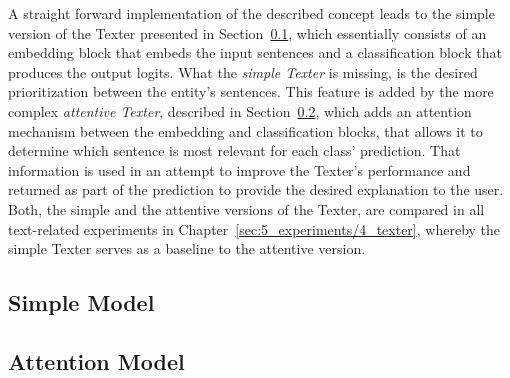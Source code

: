 A straight forward implementation of the described concept leads to the simple version of the Texter presented in Section~\ref{subsec:4_approach/1_texter/1_simple_model}, which essentially consists of an embedding block that embeds the input sentences and a classification block that produces the output logits. What the \emph{simple Texter} is missing, is the desired prioritization between the entity's sentences. This feature is added by the more complex \emph{attentive Texter}, described in Section~\ref{subsec:4_approach/1_texter/2_attention_model}, which adds an attention mechanism between the embedding and classification blocks, that allows it to determine which sentence is most relevant for each class' prediction. That information is used in an attempt to improve the Texter's performance and returned as part of the prediction to provide the desired explanation to the user. Both, the simple and the attentive versions of the Texter, are compared in all text-related experiments in Chapter~\ref{sec:5_experiments/4_texter}, whereby the simple Texter serves as a baseline to the attentive version.

\subsection{Simple Model}
\label{subsec:4_approach/1_texter/1_simple_model}


\subsection{Attention Model}
\label{subsec:4_approach/1_texter/2_attention_model}

